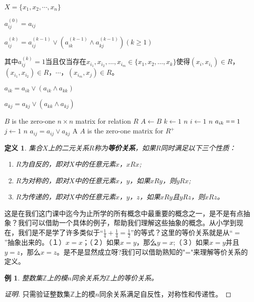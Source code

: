 \documentclass{book}[oneside]
\newtheorem{Def}{定义}[chapter]
\newtheorem{Example}{例}[chapter]
\begin{document}
\begin{CJK*}{UTF8}{gbsn}
  $X=\{x_1,x_2,\cdots,x_n\}$

  $a_{ij}^{(0)}=a_{ij}$


  $a_{ij}^{(k)}= a_{ij}^{(k-1)}\lor (a_{ik}^{(k-1)}\land a_{kj}^{(k-1)}) (k\geq 1)$

  其中$a_{ij}^{(k)}=1$当且仅当存在$x_{i_1},x_{i_2},\ldots,x_{i_m}\in \{x_1,x_2,\ldots,x_k\}$使得$(x_i,x_{i_1})\in R$，$(x_{i_1},x_{i_2})\in R$，$\cdots$，$(x_{i_m},x_j)\in R$。


  $a_{ik} = a_{ik} \lor (a_{ik} \land a_{kk})$

  $a_{kj} = a_{kj} \lor (a_{kk} \land a_{kj})$

    \begin{codebox}
    \zi \Comment $B$ is the zero-one $n \times n$ matrix for relation $R$
    \li $A \gets B$
    \li \For $k \gets 1$ \To $n$
    \li \Do
    \For $i \gets 1$ \To $n$
    \li \Do
     \If $a_{ik} \isequal 1$
    \li \Then
    \For $j \gets 1$ \To $n$
    \li \Do
    $a_{ij} = a_{ij} \lor a_{kj}$
    \End
    \End
    \End
    \End
    \li \Return A \Comment $A$ is the zero-one matrix for $R^+$
  \end{codebox}
  \begin{Def}
    集合$X$上的二元关系$R$称为{\bfseries 等价关系}，如果$R$同时满足以下三个性质：
    \begin{enumerate}
    \item $R$为自反的，即对$X$中的任意元素$x$，$xRx$;
    \item $R$为对称的，即对$X$中的任意元素$x$，$y$，如果$xRy$，则$yRx$;
    \item $R$为传递的，即对$X$中的任意元素$x$，$y$，$z$，如果$xRy$且$yRz$，则$xRz$。
    \end{enumerate}
  \end{Def}

  这是在我们这门课中迄今为止所学的所有概念中最重要的概念之一，是不是有点抽象？我们可以借助一个具体的例子，帮助我们理解这些抽象的概念。从小学到现在，我们是不是学了许多类似于“$\frac{1}{4}+\frac{1}{4}=\frac{1}{2}$”的等式？这里的等价关系就是从“$=$”抽象出来的。（１）$x=x$；（２）如果$x=y$，那么$y=x$;（３）如果$x=y$并且$y=z$，那么$x=z$。是不是显然成立呀?我们可以借助熟知的"="来理解等价关系的定义。
  \begin{Example}\label{mod}
    整数集$\mathbb{Z}$上的模$n$同余关系为$\mathbb{Z}$上的等价关系。
  \end{Example}
  \begin{proof}[证明]
    只需验证整数集$\mathbb{Z}$上的模$n$同余关系满足自反性，对称性和传递性。


\end{proof}
\end{CJK*}
\end{document}
